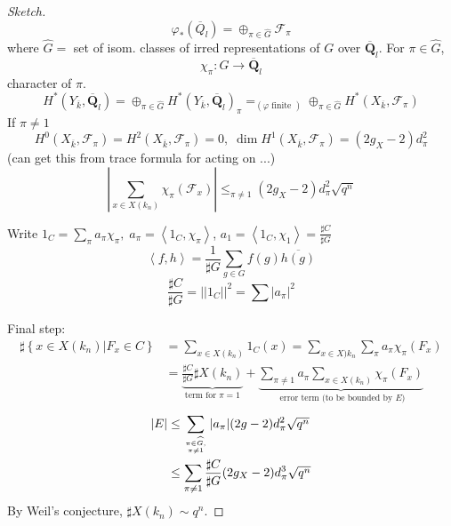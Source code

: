 \begin{proof}[Sketch]
	$$\varphi_*(\overline Q_l) = \oplus_{\pi\in \widehat G} \mathcal{F}_{\pi}$$
	where $\widehat G = $ set of isom. classes of irred representations of $G$ over $\overline{\mathbf{Q}}_l$. For $\pi\in \widehat G$, 
		$$\chi_{\pi}: G\to\overline{\mathbf{Q}}_l$$
		character of $\pi$. 
	$$H^*(Y_{\overline k}, \overline{\mathbf{Q}}_l) = \oplus_{\pi\in \widehat G} H^*(Y_{\overline k}, \overline{\mathbf{Q}}_l)_\pi =_{(\varphi\text{ finite })} \oplus_{\pi\in \widehat G}H^*(X_{\overline k}, \mathcal{F}_\pi)$$
	If $\pi\neq 1$
	$$H^0(X_{\overline k},\mathcal{F}_\pi) = H^2(X_{\overline k}, \mathcal{F}_\pi)=0, \; \dim H^1(X_{\overline k}, \mathcal{F}_\pi) = (2g_X-2)d_\pi^2$$
	(can get this from trace formula for acting on ...)
	$$\left|\sum_{x\in X(k_n)}\chi_\pi(\mathcal{F}_x)\right|\leq_{\pi\neq 1} (2g_X-2)d_\pi^2\sqrt{q^n}$$
	
	Write $1_C = \sum_\pi a_\pi\chi_\pi, \; a_\pi=\left<1_C, \chi_\pi\right>$, $a_1 = \left<1_C, \chi_1\right> = \frac{\sharp C}{\sharp G}$
	$$\left<f, h\right> = \frac{1}{\sharp G}\sum_{g\in G}f(g)\overline{h(g)}$$
	$$\frac{\sharp C}{\sharp G} = ||1_C||^2 = \sum|a_\pi|^2$$

\noindent
Final step: 
	\begin{align*}
	\sharp\left\{x\in X(k_n)\left| F_x\in C\right.\right\}&=\sum_{x\in X(k_n)}1_C(x) = \sum_{x\in X)k_n}\sum_{\pi}a_\pi\chi_\pi(F_x)\\
	&=\underbrace{\frac{\sharp C}{\sharp G}\sharp X(k_n)}_{\text{term for }\pi=1}+\underbrace{\sum_{\pi\neq 1}a_\pi\sum_{x\in X(k_n)}\chi_\pi(F_x)}_{\text{ error term (to be bounded by $E$)}}
	\end{align*}
	\begin{align*}
	|E|&\leq \sum_{\pi\in \widehat G, \atop \pi\neq 1}|a_\pi|(2g-2)d_\pi^2\sqrt{q^n}\\
	&\leq \sum_{\pi\neq 1} \frac{\sharp C}{\sharp G} (2g_X-2)d_\pi^3\sqrt{q^n}
	\end{align*}
By Weil's conjecture, $\sharp X(k_n)\sim q^n$. 
\end{proof}

